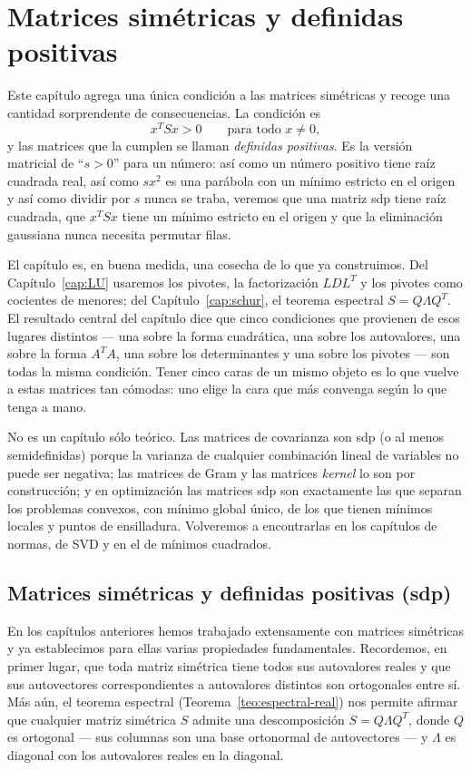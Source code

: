\chapter{Matrices simétricas y definidas positivas}\label{cap:sdp}

Este capítulo agrega una única condición a las matrices simétricas y recoge
una cantidad sorprendente de consecuencias. La condición es
\[
x^T S x > 0 \qquad \text{para todo } x \neq 0,
\]
y las matrices que la cumplen se llaman \emph{definidas positivas}. Es la
versión matricial de ``$s>0$'' para un número: así como un número positivo
tiene raíz cuadrada real, así como $s x^2$ es una parábola con un mínimo
estricto en el origen y así como dividir por $s$ nunca se traba, veremos que
una matriz sdp tiene raíz cuadrada, que $x^TSx$ tiene un mínimo estricto en el
origen y que la eliminación gaussiana nunca necesita permutar filas.

El capítulo es, en buena medida, una cosecha de lo que ya construimos. Del
Capítulo~\ref{cap:LU} usaremos los pivotes, la factorización $LDL^T$ y los
pivotes como cocientes de menores; del Capítulo~\ref{cap:schur}, el teorema
espectral $S=Q\Lambda Q^T$. El resultado central del capítulo dice que cinco
condiciones que provienen de esos lugares distintos --- una sobre la forma
cuadrática, una sobre los autovalores, una sobre la forma $A^TA$, una sobre
los determinantes y una sobre los pivotes --- son todas la misma condición.
Tener cinco caras de un mismo objeto es lo que vuelve a estas matrices tan
cómodas: uno elige la cara que más convenga según lo que tenga a mano.

No es un capítulo sólo teórico. Las matrices de covarianza son sdp (o al menos
semidefinidas) porque la varianza de cualquier combinación lineal de variables
no puede ser negativa; las matrices de Gram y las matrices \emph{kernel} lo son
por construcción; y en optimización las matrices sdp son exactamente las que
separan los problemas convexos, con mínimo global único, de los que tienen
mínimos locales y puntos de ensilladura. Volveremos a encontrarlas en los
capítulos de normas, de SVD y en el de mínimos cuadrados.

\section{Matrices simétricas y definidas positivas (sdp)}
\label{sec:sdp}

En los capítulos anteriores hemos trabajado extensamente con matrices
simétricas y ya establecimos para ellas varias propiedades fundamentales.
Recordemos, en primer lugar, que toda matriz simétrica tiene todos sus
autovalores reales y que sus autovectores correspondientes a autovalores
distintos son ortogonales entre sí. Más aún, el teorema espectral
(Teorema~\ref{teo:espectral-real}) nos permite afirmar que cualquier matriz
simétrica $S$ admite una descomposición $S = Q \Lambda Q^T$, donde $Q$ es
ortogonal --- sus columnas son una base ortonormal de autovectores --- y
$\Lambda$ es diagonal con los autovalores reales en la diagonal.

